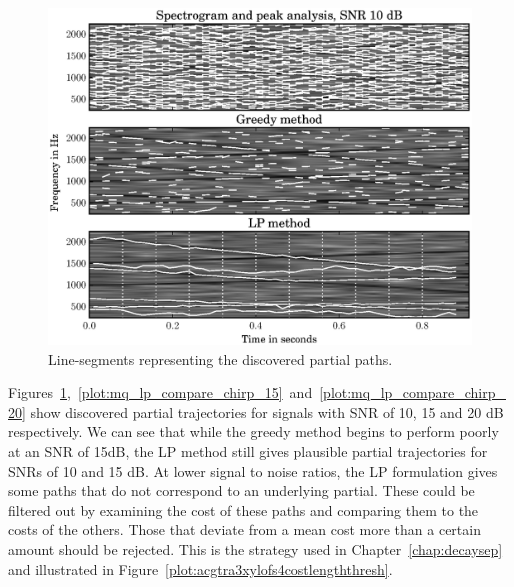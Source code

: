 \begin{figure}[!t]
    \centering
    \includegraphics[width=\figwidthscale\textwidth]{plots/mq_lp_compare_chirp_10.eps}
    \caption{ Line-segments representing the discovered partial paths.
    \label{plot:mq_lp_compare_chirp_10}}
\end{figure}
Figures~\ref{plot:mq_lp_compare_chirp_10},~\ref{plot:mq_lp_compare_chirp_15}~and~\ref{plot:mq_lp_compare_chirp_20}
show discovered partial trajectories for signals with SNR of 10, 15 and 20 dB
respectively. We can see that while the greedy method begins to perform poorly
at an SNR of 15dB, the LP method still gives plausible partial trajectories for
SNRs of 10 and 15 dB. At lower signal to noise ratios, the LP formulation gives
some paths that do not correspond to an underlying partial. These could be filtered
out by examining the cost of these paths and comparing them to the costs of the
others. Those that deviate from a mean cost more than a certain amount should be
rejected. This is the strategy used in Chapter~\ref{chap:decaysep} and
illustrated in Figure~\ref{plot:acgtra3xylofs4costlengththresh}.

